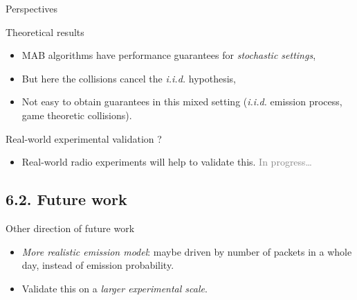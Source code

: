 \documentclass[12pt,english,ignorenonframetext,]{beamer}
\providecommand{\tightlist}{%
  \setlength{\itemsep}{0pt}\setlength{\parskip}{0pt}}
\begin{document}
\begin{frame}{Perspectives}

\begin{block}{Theoretical results}

\begin{itemize}
\tightlist
\item
  MAB algorithms have performance guarantees for \emph{stochastic
  settings},
\item
  But here the collisions cancel the \emph{i.i.d.} hypothesis,
\item
  Not easy to obtain guarantees in this mixed setting \newline
   (\emph{i.i.d.} emission process, game theoretic collisions).
\end{itemize}

\pause

\end{block}

\begin{block}{Real-world experimental validation ?}

\begin{itemize}
\tightlist
\item
  Real-world radio experiments will help to validate this. \newline
   \hspace*{40pt}\hfill{}\textcolor{gray}{In progress\dots}
\end{itemize}

\end{block}

\end{frame}



\subsection{\hfill{}6.2. Future work\hfill{}}

\begin{frame}{Other direction of future work}

\begin{itemize}
\item
  \emph{More realistic emission model}: maybe driven by number of
  packets in a whole day, instead of emission probability.
\item
  Validate this on a \emph{larger experimental scale}.
\end{itemize}

\end{frame}
\end{document}
